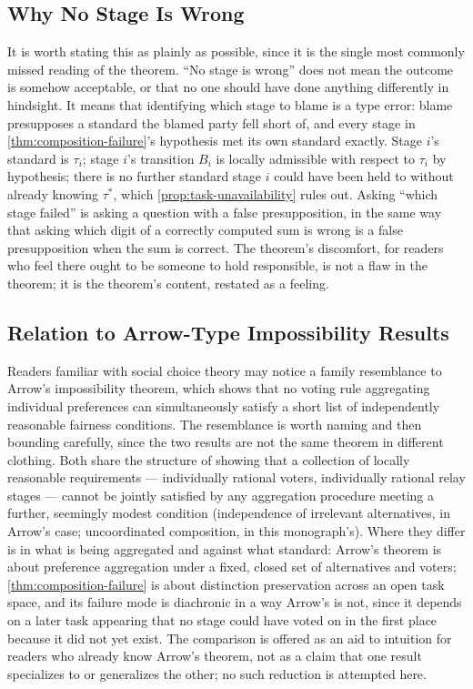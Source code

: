 \subsection{Why No Stage Is Wrong}

It is worth stating this as plainly as possible, since it is the single
most commonly missed reading of the theorem. ``No stage is wrong'' does
not mean the outcome is somehow acceptable, or that no one should have
done anything differently in hindsight. It means that identifying which
stage to blame is a type error: blame presupposes a standard the blamed
party fell short of, and every stage in \cref{thm:composition-failure}'s
hypothesis met its own standard exactly. Stage $i$'s standard is
$\tau_i$; stage $i$'s transition $B_i$ is locally admissible with
respect to $\tau_i$ by hypothesis; there is no further standard stage
$i$ could have been held to without already knowing $\tau^*$, which
\cref{prop:task-unavailability} rules out. Asking ``which stage failed''
is asking a question with a false presupposition, in the same way that
asking which digit of a correctly computed sum is wrong is a false
presupposition when the sum is correct. The theorem's discomfort, for
readers who feel there ought to be someone to hold responsible, is not a
flaw in the theorem; it is the theorem's content, restated as a feeling.

\subsection{Relation to Arrow-Type Impossibility Results}

Readers familiar with social choice theory may notice a family
resemblance to Arrow's impossibility theorem, which shows that no voting
rule aggregating individual preferences can simultaneously satisfy a
short list of independently reasonable fairness conditions. The
resemblance is worth naming and then bounding carefully, since the two
results are not the same theorem in different clothing. Both share the
structure of showing that a collection of locally reasonable
requirements --- individually rational voters, individually rational
relay stages --- cannot be jointly satisfied by any aggregation
procedure meeting a further, seemingly modest condition (independence of
irrelevant alternatives, in Arrow's case; uncoordinated composition, in
this monograph's). Where they differ is in what is being aggregated and
against what standard: Arrow's theorem is about preference aggregation
under a fixed, closed set of alternatives and voters; \cref{thm:composition-failure}
is about distinction preservation across an open task space, and its
failure mode is diachronic in a way Arrow's is not, since it depends on
a later task appearing that no stage could have voted on in the first
place because it did not yet exist. The comparison is offered as an
aid to intuition for readers who already know Arrow's theorem, not as a
claim that one result specializes to or generalizes the other; no such
reduction is attempted here.

